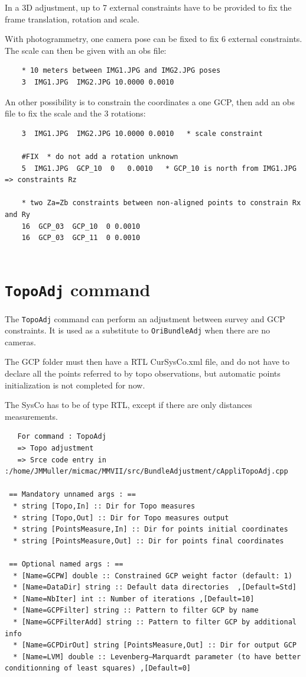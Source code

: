 In a 3D adjustment, up to 7 external constraints have to be provided to fix the frame translation, rotation and scale.

With photogrammetry, one camera pose can be fixed to fix 6 external constraints. The scale can then be given with an obs file:
\begin{verbatim}
    * 10 meters between IMG1.JPG and IMG2.JPG poses
    3  IMG1.JPG  IMG2.JPG 10.0000 0.0010   
\end{verbatim}

An other possibility is to constrain the coordinates a one GCP, then add an obs file to fix the scale and the 3 rotations:
\begin{verbatim}
    3  IMG1.JPG  IMG2.JPG 10.0000 0.0010   * scale constraint

    #FIX  * do not add a rotation unknown
    5  IMG1.JPG  GCP_10  0   0.0010   * GCP_10 is north from IMG1.JPG => constraints Rz

    * two Za=Zb constraints between non-aligned points to constrain Rx and Ry
    16  GCP_03  GCP_10  0 0.0010
    16  GCP_03  GCP_11  0 0.0010
    
\end{verbatim}


\section{{\tt TopoAdj} command}

The {\tt TopoAdj} command can perform an adjustment between survey and GCP constraints.
It is used as a substitute to {\tt OriBundleAdj} when there are no cameras.

The GCP folder must then have a RTL CurSysCo.xml file, and do not have to declare all the points
referred to by topo observations, but automatic points initialization is not completed for now.

The SysCo has to be of type RTL, except if there are only distances measurements.

\begin{verbatim}
   For command : TopoAdj 
   => Topo adjustment
   => Srce code entry in :/home/JMMuller/micmac/MMVII/src/BundleAdjustment/cAppliTopoAdj.cpp

 == Mandatory unnamed args : ==
  * string [Topo,In] :: Dir for Topo measures
  * string [Topo,Out] :: Dir for Topo measures output
  * string [PointsMeasure,In] :: Dir for points initial coordinates
  * string [PointsMeasure,Out] :: Dir for points final coordinates

 == Optional named args : ==
  * [Name=GCPW] double :: Constrained GCP weight factor (default: 1)
  * [Name=DataDir] string :: Default data directories  ,[Default=Std]
  * [Name=NbIter] int :: Number of iterations ,[Default=10]
  * [Name=GCPFilter] string :: Pattern to filter GCP by name
  * [Name=GCPFilterAdd] string :: Pattern to filter GCP by additional info
  * [Name=GCPDirOut] string [PointsMeasure,Out] :: Dir for output GCP
  * [Name=LVM] double :: Levenberg–Marquardt parameter (to have better conditionning of least squares) ,[Default=0]

\end{verbatim}



